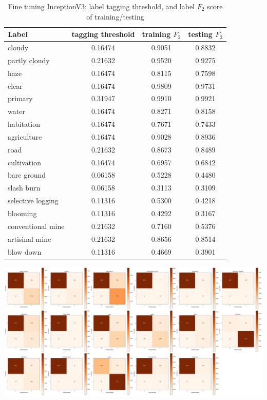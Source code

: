 \documentclass[11pt,oneside,a4paper]{article}
\newenvironment{Figure}
{\par\medskip\noindent\minipage{\linewidth}}
{\endminipage\par\medskip}
\begin{document}
\begin{table}[ht]
\begin{tabular}{l|c|c|c}
\hline
\hline
Label & tagging threshold & training $F_2$ & testing $F_2$ \\\hline
cloudy             & 0.16474 & 0.9051 & 0.8832 \\ 
partly cloudy      & 0.21632 & 0.9520 & 0.9275 \\  
haze               & 0.16474 & 0.8115 & 0.7598 \\
clear              & 0.16474 & 0.9809 & 0.9731 \\
primary            & 0.31947 & 0.9910 & 0.9921 \\
water              & 0.16474 & 0.8271 & 0.8158 \\
habitation         & 0.16474 & 0.7671 & 0.7433 \\
agriculture        & 0.16474 & 0.9028 & 0.8936 \\
road               & 0.21632 & 0.8673 & 0.8489 \\
cultivation        & 0.16474 & 0.6957 & 0.6842 \\
bare ground        & 0.06158 & 0.5228 & 0.4480 \\
slash burn         & 0.06158 & 0.3113 & 0.3109 \\
selective logging  & 0.11316 & 0.5300 & 0.4218 \\
blooming           & 0.11316 & 0.4292 & 0.3167 \\
conventional mine  & 0.21632 & 0.7160 & 0.5376 \\
artisinal mine     & 0.21632 & 0.8656 & 0.8514 \\
blow down          & 0.11316 & 0.4669 & 0.3901 \\ \hline
\end{tabular}
\caption{Fine tuning InceptionV3: label tagging threshold, and label $F_2$ score of training/testing}\label{tab:inception_f2}
\end{table}

\begin{Figure}
 \centering
 \includegraphics[width=1.1\linewidth]{label_cf.pdf}
 \label{fig:label_cf}
\end{Figure}
\end{document}
